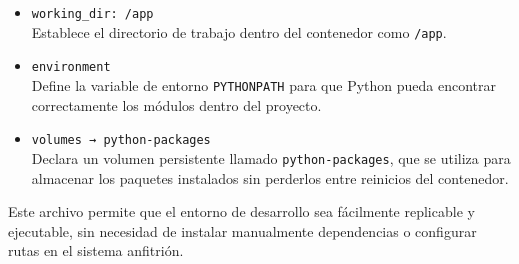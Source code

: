 \begin{itemize}
  \item \texttt{working\_dir: /app}\\
  Establece el directorio de trabajo dentro del contenedor como \texttt{/app}.

  \item \texttt{environment}\\
  Define la variable de entorno \texttt{PYTHONPATH} para que Python pueda encontrar correctamente los módulos dentro del proyecto.
  
  \item \texttt{volumes → python-packages}\\
  Declara un volumen persistente llamado \texttt{python-packages}, que se utiliza para almacenar los paquetes instalados sin perderlos entre reinicios del contenedor.
\end{itemize}

Este archivo permite que el entorno de desarrollo sea fácilmente replicable y ejecutable, sin necesidad de instalar manualmente dependencias o configurar rutas en el sistema anfitrión.
